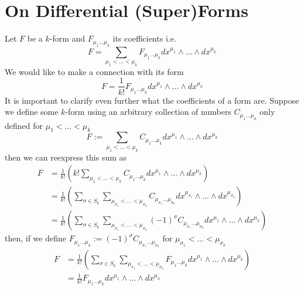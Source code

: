 \documentclass[a4paper,12pt]{article}
\numberwithin{equation}{section}
\numberwithin{thm}{section}
\numberwithin{exm}{section}
\newcommand{\we}{{\wedge}}
\newcommand{\<}{{\langle}}
\renewcommand{\>}{{\rangle}}
\newcommand{\m}{{\mu}}
\newcommand{\s}{{\sigma}}
\begin{document}
\section{On Differential (Super)Forms}
Let $F$ be a $k$-form and $F_{\m_1\ldots\m_k}$ its coefficients i.e.
	\begin{equation}
	F = \sum_{\m_1<\ldots<\m_k} F_{\m_1\ldots\m_k} dx^{\m_1} \we\ldots\we dx^{\m_k}
	\end{equation}
We would like to make a connection with its form
	\begin{equation}
	F = \frac{1}{k!} F_{\m_1\ldots\m_k} dx^{\m_1} \we\ldots\we dx^{\m_k}
	\end{equation}
It is important to clarify even further what the coefficients of a form are. Suppose we define some $k$-form using an arbitrary collection of numbers $C_{\m_1\ldots\m_k}$ only defined for $\m_1<\ldots<\m_k$
	\begin{equation}
	F := \sum_{\m_1<\ldots<\m_k} C_{\m_1\ldots\m_k} dx^{\m_1} \we\ldots\we dx^{\m_k}
	\end{equation}
then we can reexpress this sum as
	\begin{align}
	F & = \frac{1}{k!}\left( k! \sum_{\m_1<\ldots<\m_k} C_{\m_1\ldots\m_k} dx^{\m_1} \we\ldots\we dx^{\m_k}\right) \nonumber \\
	& = \frac{1}{k!}\left( \sum_{\s\in S_k} \sum_{\m_{\s_1}<\ldots<\m_{\s_k}} C_{\m_{\s_1}\ldots\m_{\s_k}} dx^{\m_{\s_1}} \we\ldots\we dx^{\m_{\s_k}}\right) \nonumber \\
	& = \frac{1}{k!}\left(\sum_{\s\in S_k} \sum_{\m_{\s_1}<\ldots<\m_{\s_k}} (-1)^{\s} C_{\m_{\s_1}\ldots\m_{\s_k}} dx^{\m_1} \we\ldots\we dx^{\m_k}\right)
	\end{align}
then, if we define $F_{\m_1\ldots\m_k} := (-1)^\s C_{\m_{\s_1}\ldots\m_{\s_k}}$ for $\m_{\s_1}<\ldots <\m_{\s_k}$
	\begin{align}
	F & = \frac{1}{k!}\left(\sum_{\s\in S_k} \sum_{\m_{\s_1}<\ldots<\m_{\s_k}} F_{\m_1\ldots\m_k} dx^{\m_1} \we\ldots\we dx^{\m_k} \right) \nonumber \\
	& = \frac{1}{k!} F_{\m_1\ldots\m_k} dx^{\m_1} \we\ldots\we dx^{\m_k}
	\end{align}
\end{document}
